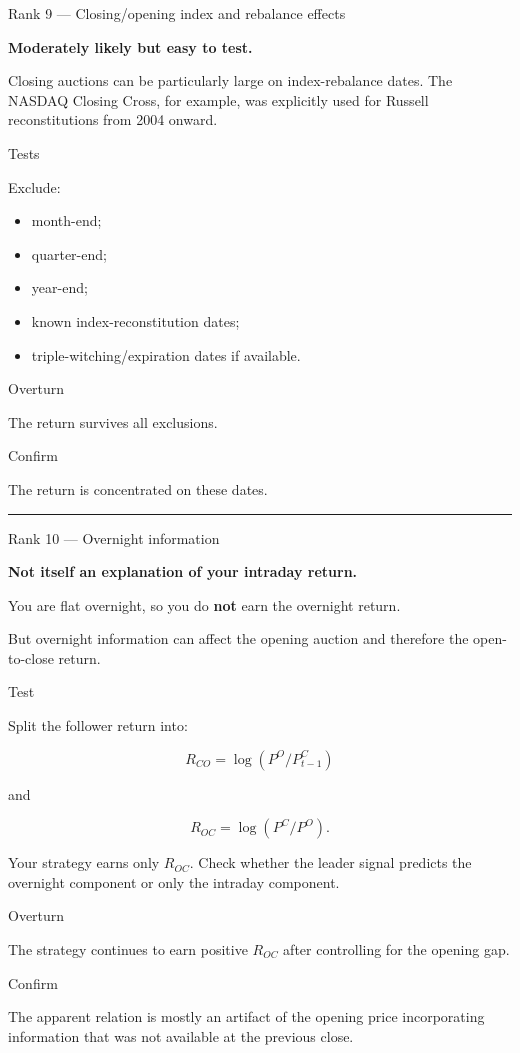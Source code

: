 Rank 9 --- Closing/opening index and rebalance effects

\textbf{Moderately likely but easy to test.}

Closing auctions can be particularly large on index-rebalance dates. The NASDAQ Closing Cross, for example, was explicitly used for Russell reconstitutions from 2004 onward.

Tests

Exclude:

\begin{itemize}
\tightlist
\item
  month-end;
\item
  quarter-end;
\item
  year-end;
\item
  known index-reconstitution dates;
\item
  triple-witching/expiration dates if available.
\end{itemize}

Overturn

The return survives all exclusions.

Confirm

The return is concentrated on these dates.

\begin{center}\rule{0.5\linewidth}{0.5pt}\end{center}

Rank 10 --- Overnight information

\textbf{Not itself an explanation of your intraday return.}

You are flat overnight, so you do \textbf{not} earn the overnight return.

But overnight information can affect the opening auction and therefore the open-to-close return.

Test

Split the follower return into:

\[
R_{CO}=\log(P^O/P^C_{t-1})
\]

and

\[
R_{OC}=\log(P^C/P^O).
\]

Your strategy earns only \(R_{OC}\). Check whether the leader signal predicts the overnight component or only the intraday component.

Overturn

The strategy continues to earn positive \(R_{OC}\) after controlling for the opening gap.

Confirm

The apparent relation is mostly an artifact of the opening price incorporating information that was not available at the previous close.

